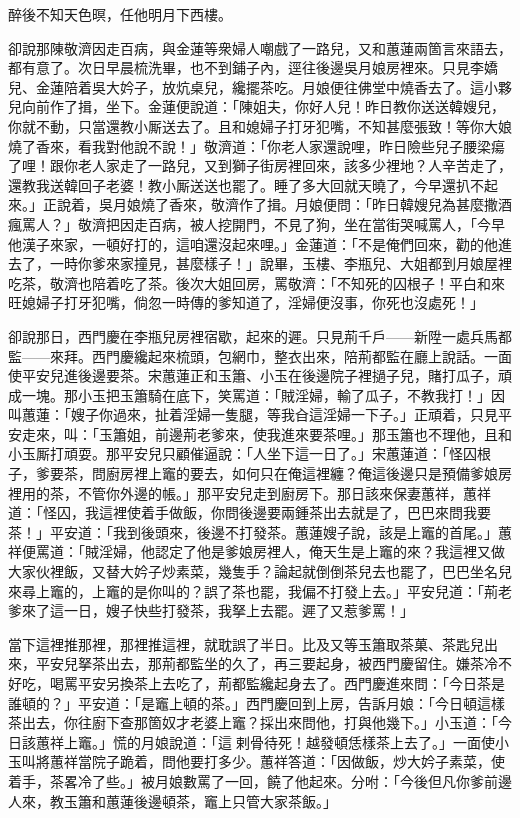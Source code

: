 \begin{myquote} 
醉後不知天色暝，任他明月下西樓。
\end{myquote} 

卻說那陳敬濟因走百病，與金蓮等衆婦人嘲戲了一路兒，又和蕙蓮兩箇言來語去，都有意了。次日早晨梳洗畢，也不到鋪子內，逕往後邊吳月娘房裡來。只見李嬌兒、金蓮陪着吳大妗子，放炕桌兒，纔擺茶吃。月娘便往佛堂中燒香去了。這小夥兒向前作了揖，坐下。金蓮便說道：「陳姐夫，你好人兒！昨日教你送送韓嫂兒，你就不動，只當還教小厮送去了。且和媳婦子打牙犯嘴，不知甚麼張致！{}等你大娘燒了香來，看我對他說不說！」敬濟道：「你老人家還說哩，昨日險些兒子腰梁瘍了哩！跟你老人家走了一路兒，又到獅子街房裡回來，該多少裡地？人辛苦走了，還教我送韓回子老婆！教小厮送送也罷了。睡了多大回就天曉了，今早還扒不起來。」正說着，吳月娘燒了香來，敬濟作了揖。月娘便問：「昨日韓嫂兒為甚麼撒酒瘋罵人？」敬濟把因走百病，被人挖開門，不見了狗，坐在當街哭喊罵人，「今早他漢子來家，一頓好打的，{}這咱還沒起來哩。」金蓮道：「不是俺們回來，勸的他進去了，一時你爹來家撞見，甚麼樣子！」說畢，玉樓、李瓶兒、大姐都到月娘屋裡吃茶，敬濟也陪着吃了茶。後次大姐回房，罵敬濟：「不知死的囚根子！平白和來旺媳婦子打牙犯嘴，倘忽一時傳的爹知道了，淫婦便沒事，{}{}你死也沒處死！」

卻說那日，西門慶在李瓶兒房裡宿歇，起來的遲。只見荊千戶——新陞一處兵馬都監——來拜。西門慶纔起來梳頭，包網巾，整衣出來，陪荊都監在廳上說話。一面使平安兒進後邊要茶。宋蕙蓮正和玉簫、小玉在後邊院子裡撾子兒，賭打瓜子，頑成一塊。那小玉把玉簫騎在底下，笑罵道：「賊淫婦，輸了瓜子，不教我打！」因叫蕙蓮：「嫂子你過來，扯着淫婦一隻腿，等我㒲這淫婦一下子。」{}正頑着，只見平安走來，叫：「玉簫姐，前邊荊老爹來，使我進來要茶哩。」那玉簫也不理他，且和小玉厮打頑耍。那平安兒只顧催逼說：「人坐下這一日了。」宋蕙蓮道：「怪囚根子，爹要茶，問廚房裡上竈的要去，如何只在俺這裡纏？俺這後邊只是預備爹娘房裡用的茶，不管你外邊的帳。」那平安兒走到廚房下。那日該來保妻蕙祥，蕙祥道：「怪囚，我這裡使着手做飯，你問後邊要兩鍾茶出去就是了，巴巴來問我要茶！」平安道：「我到後頭來，後邊不打發茶。蕙蓮嫂子說，該是上竈的首尾。」蕙祥便罵道：「賊淫婦，他認定了他是爹娘房裡人，{}俺天生是上竈的來？我這裡又做大家伙裡飯，又替大妗子炒素菜，幾隻手？論起就倒倒茶兒去也罷了，巴巴坐名兒來尋上竈的，上竈的是你叫的？{}誤了茶也罷，我偏不打發上去。」平安兒道：「荊老爹來了這一日，嫂子快些打發茶，我拏上去罷。遲了又惹爹罵！」

當下這裡推那裡，那裡推這裡，就耽誤了半日。比及又等玉簫取茶菓、茶匙兒出來，平安兒拏茶出去，那荊都監坐的久了，再三要起身，被西門慶留住。嫌茶冷不好吃，喝罵平安另換茶上去吃了，荊都監纔起身去了。西門慶進來問：「今日茶是誰頓的？」平安道：「是竈上頓的茶。」西門慶回到上房，告訴月娘：「今日頓這樣茶出去，你往廚下查那箇奴才老婆上竈？採出來問他，打與他幾下。」小玉道：「今日該蕙祥上竈。」慌的月娘說道：「這𢱉剌骨待死！越發頓恁樣茶上去了。」一面使小玉叫將蕙祥當院子跪着，問他要打多少。蕙祥答道：「因做飯，炒大妗子素菜，使着手，茶畧冷了些。」被月娘數罵了一回，饒了他起來。分咐：「今後但凡你爹前邊人來，教玉簫和蕙蓮後邊頓茶，竈上只管大家茶飯。」

